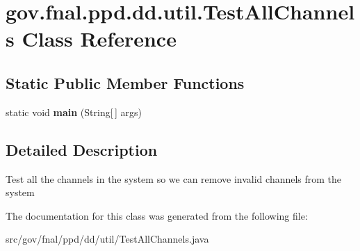\hypertarget{classgov_1_1fnal_1_1ppd_1_1dd_1_1util_1_1TestAllChannels}{\section{gov.\-fnal.\-ppd.\-dd.\-util.\-Test\-All\-Channels Class Reference}
\label{classgov_1_1fnal_1_1ppd_1_1dd_1_1util_1_1TestAllChannels}
}
\subsection*{Static Public Member Functions}
\begin{DoxyCompactItemize}
\item 
\hypertarget{classgov_1_1fnal_1_1ppd_1_1dd_1_1util_1_1TestAllChannels_a444c0415e737abefd5d836bd8902f021}{static void {\bfseries main} (String\mbox{[}$\,$\mbox{]} args)}\label{classgov_1_1fnal_1_1ppd_1_1dd_1_1util_1_1TestAllChannels_a444c0415e737abefd5d836bd8902f021}

\end{DoxyCompactItemize}


\subsection{Detailed Description}
Test all the channels in the system so we can remove invalid channels from the system 

The documentation for this class was generated from the following file\-:\begin{DoxyCompactItemize}
\item 
src/gov/fnal/ppd/dd/util/Test\-All\-Channels.\-java\end{DoxyCompactItemize}
